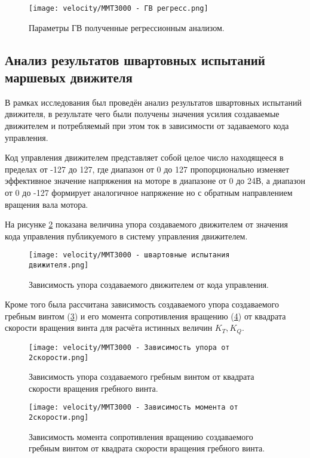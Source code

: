 \begin{figure}[ht]
    \centering
    \texttt{[image: velocity/MMT3000 - ГВ регресс.png]}
    \caption{Параметры ГВ полученные регрессионным анализом.}
    \label{fig:mmt3000_propeller}
\end{figure}

\subsection{Анализ результатов швартовных испытаний маршевых движителя}
В рамках исследования был проведён анализ результатов швартовных испытаний движителя, в результате чего были получены значения усилия создаваемые движителем и потребляемый при этом ток в зависимости от задаваемого кода управления.

Код управления движителем представляет собой целое число находящееся в пределах от -127 до 127, где диапазон от 0 до 127 пропорционально изменяет эффективное значение напряжения на моторе в диапазоне от 0 до 24В, а диапазон от 0 до -127 формирует аналогичное напряжение но с обратным направлением вращения вала мотора.

На рисунке \ref{fig:mmt3000_bollardpul} показана величина упора создаваемого движителем от значения кода управления публикуемого в систему управления движителем.
\begin{figure}[ht]
    \centering
    \texttt{[image: velocity/MMT3000 - швартовные испытания движителя.png]}
    \caption{Зависимость упора создаваемого движителем от кода управления.}
    \label{fig:mmt3000_bollardpul}
\end{figure}

Кроме того была рассчитана зависимость создаваемого упора создаваемого гребным винтом (\ref{fig:mmt3000_thrust_rotation2}) и его момента сопротивления вращению (\ref{fig:mmt3000_torque_rotation2}) от квадрата скорости вращения винта для расчёта истинных величин $K_T,K_Q$.

\begin{figure}[ht]
    \centering
    \texttt{[image: velocity/MMT3000 - Зависимость упора от 2скорости.png]}
    \caption{Зависимость упора создаваемого гребным винтом от квадрата скорости вращения гребного винта.}
    \label{fig:mmt3000_thrust_rotation2}
\end{figure}

\begin{figure}[ht]
    \centering
    \texttt{[image: velocity/MMT3000 - Зависимость момента от 2скорости.png]}
    \caption{Зависимость момента сопротивления вращению создаваемого гребным винтом от квадрата скорости вращения гребного винта.}
    \label{fig:mmt3000_torque_rotation2}
\end{figure}

